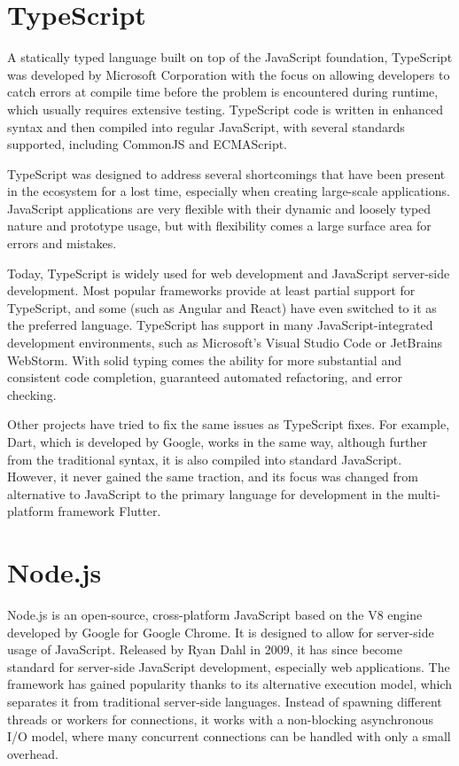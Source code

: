 \section{TypeScript}
A statically typed language built on top of the JavaScript foundation,
TypeScript was developed by Microsoft Corporation with the focus on allowing
developers to catch errors at compile time before the problem is encountered
during runtime, which usually requires extensive testing. TypeScript code is
written in enhanced syntax and then compiled into regular JavaScript, with
several standards supported, including CommonJS and ECMAScript.

TypeScript was designed to address several shortcomings that have been present
in the ecosystem for a lost time, especially when creating large-scale
applications. JavaScript applications are very flexible with their dynamic and
loosely typed nature and prototype usage, but with flexibility comes a large
surface area for errors and mistakes. 

Today, TypeScript is widely used for web development and JavaScript server-side
development. Most popular frameworks provide at least partial support for
TypeScript, and some (such as Angular and React) have even switched to it as the
preferred language. TypeScript has support in many JavaScript-integrated
development environments, such as Microsoft's Visual Studio Code or JetBrains
WebStorm. With solid typing comes the ability for more substantial and
consistent code completion, guaranteed automated refactoring, and error
checking.

Other projects have tried to fix the same issues as TypeScript fixes. For
example, Dart, which is developed by Google, works in the same way, although
further from the traditional syntax, it is also compiled into standard
JavaScript. However, it never gained the same traction, and its focus was
changed from alternative to JavaScript to the primary language for development
in the multi-platform framework Flutter.


\section{Node.js}
Node.js is an open-source, cross-platform JavaScript based on the V8 engine
developed by Google for Google Chrome. It is designed to allow for server-side
usage of JavaScript. Released by Ryan Dahl in 2009, it has since become standard
for server-side JavaScript development, especially web applications. The
framework has gained popularity thanks to its alternative execution model, which
separates it from traditional server-side languages. Instead of spawning
different threads or workers for connections, it works with a non-blocking
asynchronous I/O model, where many concurrent connections can be handled with
only a small overhead.

